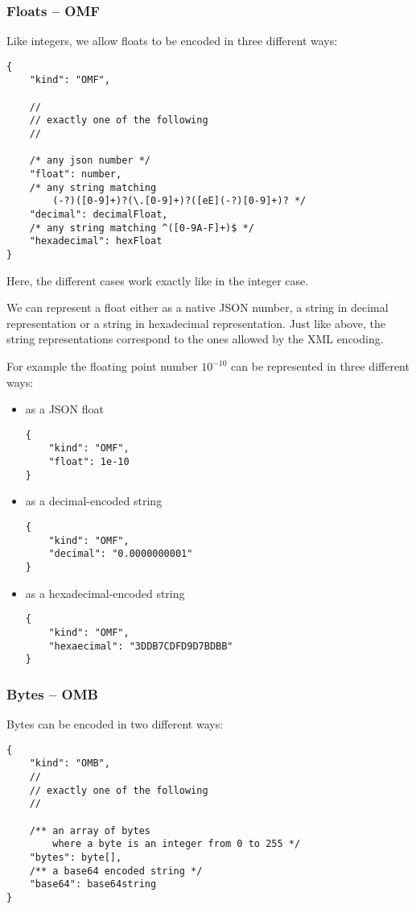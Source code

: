 \subsubsection{Floats -- OMF}

Like integers, we allow floats to be encoded in three different ways:
\begin{lstlisting}
{
    "kind": "OMF",

    //
    // exactly one of the following
    //

    /* any json number */
    "float": number,
    /* any string matching 
        (-?)([0-9]+)?(\.[0-9]+)?([eE](-?)[0-9]+)? */
    "decimal": decimalFloat,
    /* any string matching ^([0-9A-F]+)$ */
    "hexadecimal": hexFloat 
}
\end{lstlisting}

Here, the different cases work exactly like in the integer case. 

We can represent a float either as a native JSON number, a string in decimal representation or a string in hexadecimal representation. 
Just like above, the string representations correspond to the ones allowed by the XML encoding. 

For example the floating point number $10^{-10}$ can be represented in three different ways:
\begin{itemize}
    \item as a JSON float
\begin{lstlisting}
{
    "kind": "OMF",
    "float": 1e-10
}
\end{lstlisting}
    \item as a decimal-encoded string
\begin{lstlisting}
{
    "kind": "OMF",
    "decimal": "0.0000000001"
}
\end{lstlisting}
    \item as a hexadecimal-encoded string
\begin{lstlisting}
{
    "kind": "OMF",
    "hexaecimal": "3DDB7CDFD9D7BDBB"
}
\end{lstlisting}
\end{itemize}

\subsubsection{Bytes -- OMB}

Bytes can be encoded in two different ways:
\begin{lstlisting}
{
    "kind": "OMB",
    //
    // exactly one of the following
    //

    /** an array of bytes
        where a byte is an integer from 0 to 255 */
    "bytes": byte[],
    /** a base64 encoded string */
    "base64": base64string
}
\end{lstlisting}

